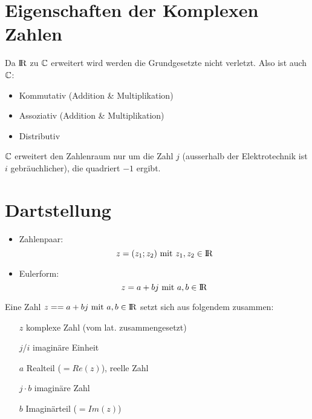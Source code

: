 \section{Eigenschaften der Komplexen Zahlen}
Da $\text{\rmfamily I\!R}$ zu $\mathbb{C}$ erweitert wird werden die Grundgesetzte nicht verletzt. Also ist auch $\mathbb{C}$:
\begin{itemize}
\item Kommutativ (Addition \& Multiplikation)
\item Assoziativ (Addition \& Multiplikation)
\item Distributiv
\end{itemize} 

$\mathbb{C}$ erweitert den Zahlenraum nur um die Zahl $j$ (ausserhalb der Elektrotechnik ist $i$ gebräuchlicher), die quadriert $-1$ ergibt.

\section{Dartstellung}
\begin{itemize}
\item Zahlenpaar:
\[
	z=(z_1;z_2) \text{ mit } z_1,z_2\in\text{\rmfamily I\!R}
\]
\item Eulerform:
\[
	z = a + bj\text{ mit } a,b\in\text{\rmfamily I\!R}
\]
\end{itemize}

Eine Zahl $z== a + bj\text{ mit } a,b\in\text{\rmfamily I\!R}$ setzt sich aus folgendem zusammen:
\begin{itemize}
\item[$z$] komplexe Zahl (vom lat. zusammengesetzt)
\item[$j$/$i$] imaginäre Einheit
\item[$a$] Realteil ($=Re(z)$), reelle Zahl
\item[$j\cdot b$] imaginäre Zahl
\item[$b$] Imaginärteil ($=Im(z)$)
\end{itemize}

